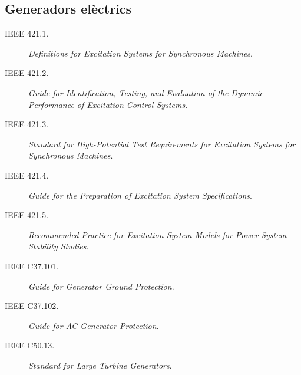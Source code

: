 \subsection*{Generadors elèctrics}
\begin{description}
	\item [\hspace{5mm}IEEE 421.1.] \textit{Definitions for Excitation Systems for Synchronous Machines}.
	\item [\hspace{5mm}IEEE 421.2.] \textit{Guide for Identification, Testing, and Evaluation of the Dynamic Performance of Excitation Control Systems}.
	\item [\hspace{5mm}IEEE 421.3.] \textit{Standard for High-Potential Test Requirements for Excitation Systems for Synchronous Machines}.
	\item [\hspace{5mm}IEEE 421.4.] \textit{Guide for the Preparation of Excitation System Specifications}.
	\item [\hspace{5mm}IEEE 421.5.] \textit{Recommended Practice for Excitation System Models for Power System Stability Studies}.
	\item [\hspace{5mm}IEEE C37.101.] \textit{Guide for Generator Ground Protection}.
	\item [\hspace{5mm}IEEE C37.102.] \textit{Guide for AC Generator Protection}.
	\item [\hspace{5mm}IEEE C50.13.] \textit{Standard for Large Turbine Generators}.
\end{description}


